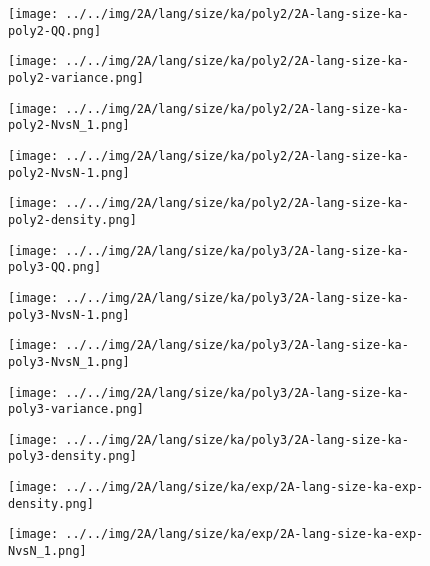 \begin{figure}[H]
\centering	\texttt{[image: ../../img/2A/lang/size/ka/poly2/2A-lang-size-ka-poly2-QQ.png]}
\end{figure}
\begin{figure}[H]
\centering	\texttt{[image: ../../img/2A/lang/size/ka/poly2/2A-lang-size-ka-poly2-variance.png]}
\end{figure}
\begin{figure}[H]
\centering	\texttt{[image: ../../img/2A/lang/size/ka/poly2/2A-lang-size-ka-poly2-NvsN\_1.png]}
\end{figure}
\begin{figure}[H]
\centering	\texttt{[image: ../../img/2A/lang/size/ka/poly2/2A-lang-size-ka-poly2-NvsN-1.png]}
\end{figure}
\begin{figure}[H]
\centering	\texttt{[image: ../../img/2A/lang/size/ka/poly2/2A-lang-size-ka-poly2-density.png]}
\end{figure}
\begin{figure}[H]
\centering	\texttt{[image: ../../img/2A/lang/size/ka/poly3/2A-lang-size-ka-poly3-QQ.png]}
\end{figure}
\begin{figure}[H]
\centering	\texttt{[image: ../../img/2A/lang/size/ka/poly3/2A-lang-size-ka-poly3-NvsN-1.png]}
\end{figure}
\begin{figure}[H]
\centering	\texttt{[image: ../../img/2A/lang/size/ka/poly3/2A-lang-size-ka-poly3-NvsN\_1.png]}
\end{figure}
\begin{figure}[H]
\centering	\texttt{[image: ../../img/2A/lang/size/ka/poly3/2A-lang-size-ka-poly3-variance.png]}
\end{figure}
\begin{figure}[H]
\centering	\texttt{[image: ../../img/2A/lang/size/ka/poly3/2A-lang-size-ka-poly3-density.png]}
\end{figure}
\begin{figure}[H]
\centering	\texttt{[image: ../../img/2A/lang/size/ka/exp/2A-lang-size-ka-exp-density.png]}
\end{figure}
\begin{figure}[H]
\centering	\texttt{[image: ../../img/2A/lang/size/ka/exp/2A-lang-size-ka-exp-NvsN\_1.png]}
\end{figure}
